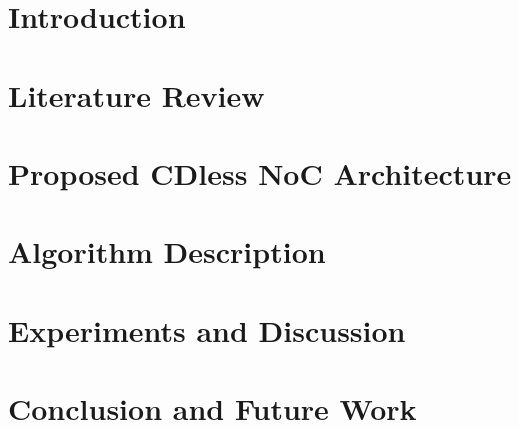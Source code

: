 \documentclass[11pt,oneside,final]{ntu_qe}
\newcommand{\setdoublespace}{\dsp}
\newcommand*\NewPage{\newpage\null\thispagestyle{empty}\newpage}
\begin{document}
\setdoublespace


\hsp
\NewPage

\hsp
\chapter{Introduction}\label{CH1} %

\chapter{Literature Review}\label{CH2}

\chapter{Proposed CDless NoC Architecture}\label{CH3}

\chapter{Algorithm Description}\label{CH4}

\chapter{Experiments and Discussion}\label{CH5}

\chapter{Conclusion and Future Work}\label{CH6}

\end{document}
